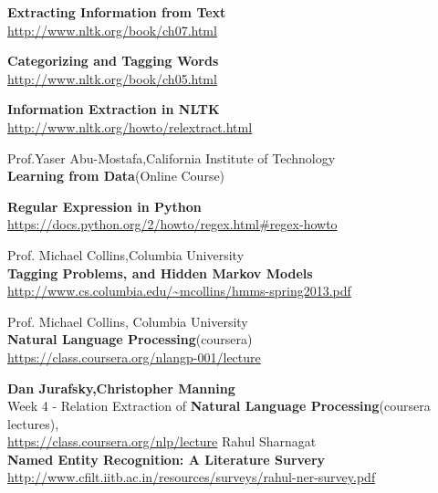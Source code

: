 \documentclass[12pt]{report}
\begin{document}
\begin{thebibliography}{99}
\textbf{Extracting Information from Text}\\
\url{http://www.nltk.org/book/ch07.html}

\textbf{Categorizing and Tagging Words}\\
\url{http://www.nltk.org/book/ch05.html}

\textbf{Information Extraction in NLTK}\\
\url{http://www.nltk.org/howto/relextract.html}

Prof.Yaser Abu-Mostafa,California Institute of Technology\\
\textbf{Learning from Data}(Online Course)

\textbf{Regular Expression in Python}\\
\url{https://docs.python.org/2/howto/regex.html#regex-howto}

Prof. Michael Collins,Columbia University\\
\textbf{Tagging Problems, and Hidden Markov Models}\\
\url{http://www.cs.columbia.edu/~mcollins/hmms-spring2013.pdf}

Prof. Michael Collins, Columbia University\\
\textbf{Natural Language Processing}(coursera)\\
\url{https://class.coursera.org/nlangp-001/lecture}

\textbf{Dan Jurafsky,Christopher Manning}\\
Week 4 - Relation Extraction of \textbf{Natural Language Processing}(coursera lectures),\\
\url{https://class.coursera.org/nlp/lecture}
Rahul Sharnagat\\
\textbf{Named Entity Recognition: A Literature Survery}\\
\url{http://www.cfilt.iitb.ac.in/resources/surveys/rahul-ner-survey.pdf}
\end{thebibliography}
\end{document}

